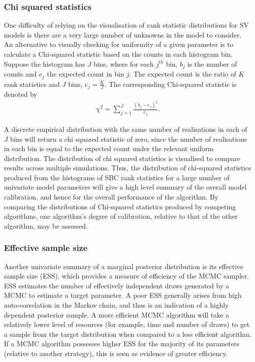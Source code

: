 \documentclass[12pt, a4paper]{article}
\begin{document}
            \subsubsection{Chi squared statistics}
            One difficulty of relying on the visualisation of rank statistic distributions for SV models is there are a very large number of unknowns in the model to consider. An alternative to visually checking for uniformity of a given parameter is to calculate a Chi-squared statistic based on the counts in each histogram bin. Suppose the histogram has $J$ bins, where for each $j^{th}$ bin, $b_j$ is the number of counts and $e_j$ the expected count in bin $j$. The expected count is the ratio of $K$ rank statistics and $J$ bins, $e_j=\frac{K}{J}$. The corresponding Chi-squared statistic is denoted by
            \begin{align}
            \chi^2 = \sum_{j=1}^J \frac{(b_{j} - e_{j})^2}{e_j}.
            \end{align}
            
            A discrete empirical distribution with the same number of realisations in each of $J$ bins will return a chi squared statistic of zero, since the number of realisations in each bin is equal to the expected count under the relevant  uniform distribution. The distribution of chi squared statistics is visualised to compare results across multiple simulations. Thus, the distribution of chi-squared statistics produced from the histograms of SBC rank statistics for a large number of univariate model parameters will give a high level summary of the overall model calibration, and hence for the overall performance of the algorithm. By comparing the distributions of Chi-squared statistics produced by competing algorithms, one algorithm's degree of calibration, relative to that of the other algorithm, may be assessed. 

            \subsubsection{Effective sample size}
            Another univariate summary of a marginal posterior distribution is its effective sample size (ESS), which provides a measure of efficiency of the MCMC sampler. ESS estimates the number of effectively independent draws generated by a MCMC to estimate a target parameter. A poor ESS generally arises from high auto-correlation in the Markov chain, and thus is an indication of a highly dependent posterior sample. A more efficient MCMC algorithm will take a relatively lower level of resources (for example, time and number of draws) to get a sample from the target distribution when compared to a less efficient algorithm. If a MCMC algorithm possesses higher ESS for the majority of its parameters (relative to another strategy), this is seen as evidence of greater efficiency.
            
\end{document}
